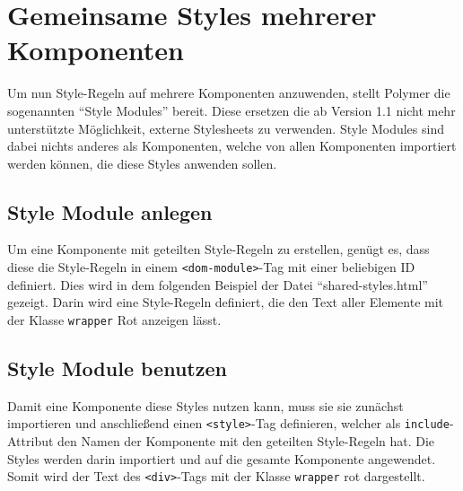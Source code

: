 \section{Gemeinsame Styles mehrerer
Komponenten}\label{gemeinsame-styles-mehrerer-komponenten}

Um nun Style-Regeln auf mehrere Komponenten anzuwenden, stellt Polymer
die sogenannten ``Style Modules'' bereit. Diese ersetzen die ab Version
1.1 nicht mehr unterstützte Möglichkeit, externe Stylesheets zu
verwenden. Style Modules sind dabei nichts anderes als Komponenten,
welche von allen Komponenten importiert werden können, die diese Styles
anwenden sollen.

\subsection{Style Module anlegen}\label{style-module-anlegen}

Um eine Komponente mit geteilten Style-Regeln zu erstellen, genügt es,
dass diese die Style-Regeln in einem
\texttt{\textless{}dom-module\textgreater{}}-Tag mit einer beliebigen ID
definiert. Dies wird in dem folgenden Beispiel der Datei
``shared-styles.html'' gezeigt. Darin wird eine Style-Regeln definiert,
die den Text aller Elemente mit der Klasse \texttt{wrapper} Rot anzeigen
lässt.

\begin{Shaded}
\begin{Highlighting}[]
\KeywordTok{>}
       \KeywordTok{\{}  \KeywordTok{;} \KeywordTok{\}}
\end{Highlighting}
\end{Shaded}

\subsection{Style Module benutzen}\label{style-module-benutzen}

Damit eine Komponente diese Styles nutzen kann, muss sie sie zunächst
importieren und anschließend einen
\texttt{\textless{}style\textgreater{}}-Tag definieren, welcher als
\texttt{include}-Attribut den Namen der Komponente mit den geteilten
Style-Regeln hat. Die Styles werden darin importiert und auf die gesamte
Komponente angewendet. Somit wird der Text des
\texttt{\textless{}div\textgreater{}}-Tags mit der Klasse
\texttt{wrapper} rot dargestellt.

